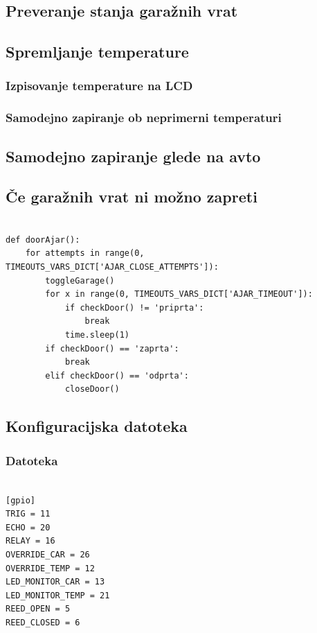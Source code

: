 \documentclass[11pt]{article}
\begin{document}
\subsection{Preveranje stanja garažnih vrat}

\subsection{Spremljanje temperature}

\subsubsection{Izpisovanje temperature na LCD}


\subsubsection{Samodejno zapiranje ob neprimerni temperaturi}


\subsection{Samodejno zapiranje glede na avto}


\subsection{Če garažnih vrat ni možno zapreti}
\begin{verbatim}
  
def doorAjar():
    for attempts in range(0, TIMEOUTS_VARS_DICT['AJAR_CLOSE_ATTEMPTS']):
        toggleGarage()
        for x in range(0, TIMEOUTS_VARS_DICT['AJAR_TIMEOUT']):
            if checkDoor() != 'priprta':
                break
            time.sleep(1)
        if checkDoor() == 'zaprta':
            break
        elif checkDoor() == 'odprta':
            closeDoor()
\end{verbatim}

\subsection{Konfiguracijska datoteka}
\subsubsection{Datoteka}
\begin{verbatim}
  
[gpio]
TRIG = 11
ECHO = 20
RELAY = 16
OVERRIDE_CAR = 26
OVERRIDE_TEMP = 12
LED_MONITOR_CAR = 13
LED_MONITOR_TEMP = 21
REED_OPEN = 5
REED_CLOSED = 6
\end{verbatim}
\end{document}
